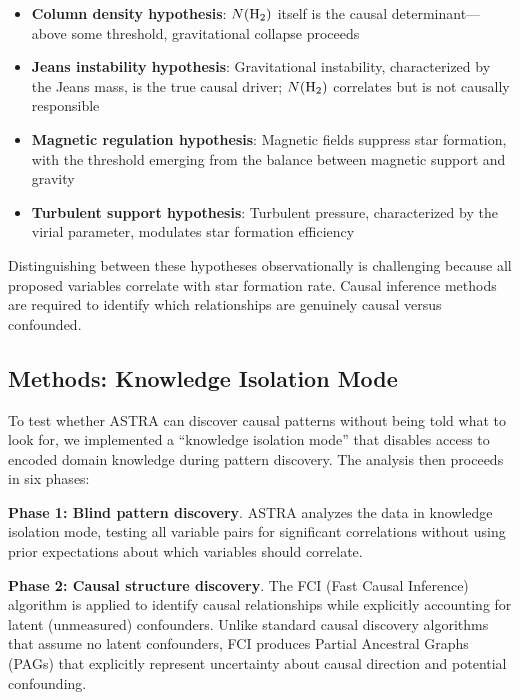 \documentclass[usenatbib]{rasti}
\begin{document}
\begin{itemize}
\item \textbf{Column density hypothesis}: $N({\rm H_2})$ itself is the causal determinant---above some threshold, gravitational collapse proceeds
\item \textbf{Jeans instability hypothesis}: Gravitational instability, characterized by the Jeans mass, is the true causal driver; $N({\rm H_2})$ correlates but is not causally responsible
\item \textbf{Magnetic regulation hypothesis}: Magnetic fields suppress star formation, with the threshold emerging from the balance between magnetic support and gravity
\item \textbf{Turbulent support hypothesis}: Turbulent pressure, characterized by the virial parameter, modulates star formation efficiency
\end{itemize}

Distinguishing between these hypotheses observationally is challenging because all proposed variables correlate with star formation rate. Causal inference methods are required to identify which relationships are genuinely causal versus confounded.

\subsection{Methods: Knowledge Isolation Mode}

To test whether ASTRA can discover causal patterns without being told what to look for, we implemented a ``knowledge isolation mode'' that disables access to encoded domain knowledge during pattern discovery. The analysis then proceeds in six phases:

\noindent\textbf{Phase 1: Blind pattern discovery}. ASTRA analyzes the data in knowledge isolation mode, testing all variable pairs for significant correlations without using prior expectations about which variables should correlate.

\noindent\textbf{Phase 2: Causal structure discovery}. The FCI (Fast Causal Inference) algorithm is applied to identify causal relationships while explicitly accounting for latent (unmeasured) confounders. Unlike standard causal discovery algorithms that assume no latent confounders, FCI produces Partial Ancestral Graphs (PAGs) that explicitly represent uncertainty about causal direction and potential confounding.
\end{document}
